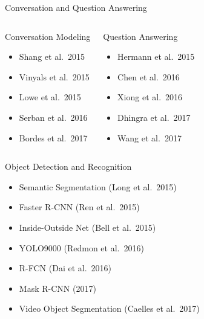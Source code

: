 \documentclass{beamer}
\begin{document}
\begin{frame}{Conversation and Question Answering}

\begin{columns}


\begin{block}{Conversation Modeling}
\begin{itemize}
\item Shang et al.\ 2015
\item Vinyals et al.\ 2015
\item Lowe et al.\ 2015
\item Serban et al.\ 2016
\item Bordes et al.\ 2017
\end{itemize}
\end{block}


\begin{block}{Question Answering}
\begin{itemize}
\item Hermann et al.\ 2015
\item Chen et al.\ 2016
\item Xiong et al.\ 2016
\item Dhingra et al.\ 2017
\item Wang et al.\ 2017
\end{itemize}
\end{block}

\end{columns}

\end{frame}


\begin{frame}{Object Detection and Recognition}

\begin{itemize}

\item Semantic Segmentation (Long et al.\ 2015)

\item Faster R-CNN (Ren et al.\ 2015)

\item Inside-Outside Net (Bell et al.\ 2015)

\item YOLO9000 (Redmon et al.\ 2016)

\item R-FCN (Dai et al.\ 2016)

\item Mask R-CNN (2017)

\item Video Object Segmentation (Caelles et al.\ 2017)

\end{itemize}

\end{frame}
\end{document}
